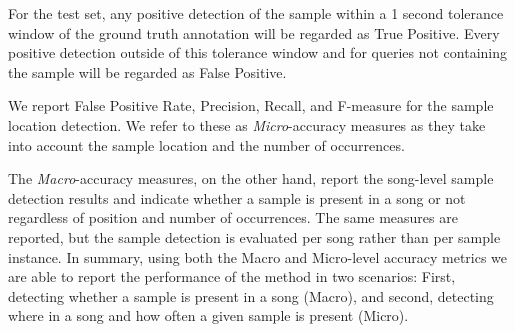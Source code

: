 \documentclass{article}
\begin{document}
For the test set, any positive detection of the sample within a 1 second tolerance window of the ground truth annotation will be regarded as True Positive. Every positive detection outside of this tolerance window and for queries not containing the sample will be regarded as False Positive.

We report False Positive Rate, Precision, Recall, and F-measure for the sample location detection. We refer to these as \textit{Micro}-accuracy measures as they take into account the sample location and the number of occurrences.

The \textit{Macro}-accuracy measures, on the other hand, report the song-level sample detection results and indicate whether a sample is present in a song or not regardless of position and number of occurrences. The same measures are reported, but the sample detection is evaluated per song rather than per sample instance.
In summary, using both the Macro and Micro-level accuracy metrics we are able to report the performance of the method in two scenarios: First, detecting whether a sample is present in a song (Macro), and second, detecting where in a song and how often a given sample is present (Micro).
\end{document}
